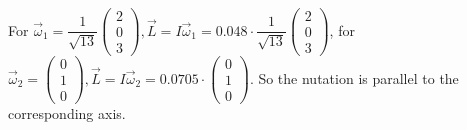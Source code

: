 \documentclass[a4paper,12pt,titlepage]{article}
\begin{document}
For $\overrightarrow{\omega}_1=\dfrac{1}{\sqrt{13}}\begin{pmatrix}
2\\0\\3\end{pmatrix}, \overrightarrow{L}=I\overrightarrow{\omega}_1=0.048\cdot \dfrac{1}{\sqrt{13}}\begin{pmatrix}
2\\0\\3\end{pmatrix}$, for $\overrightarrow{\omega}_2=\begin{pmatrix}
0\\1\\0\end{pmatrix}, \overrightarrow{L}=I\overrightarrow{\omega}_2=0.0705\cdot \begin{pmatrix}
0\\1\\0\end{pmatrix}$. So the nutation is parallel to the corresponding axis.
\end{document}
